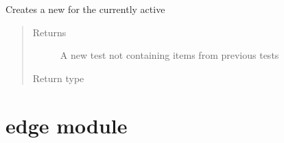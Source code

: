 \documentclass[letterpaper,10pt,english]{sphinxmanual}
\begin{document}
\begin{fulllineitems}
\begin{fulllineitems}
\end{fulllineitems}


\begin{fulllineitems}
\label{\detokenize{consumer:consumer.Consumer.create_test}}
Creates a new {\hyperref[\detokenize{test:test.Test}]{}} for the currently active {\hyperref[\detokenize{user:user.User}]{}}
\begin{quote}\begin{description}
\item[{Returns}] \leavevmode
A new test not containing items from previous tests

\item[{Return type}] \leavevmode
{\hyperref[\detokenize{test:test.Test}]{}}

\end{description}\end{quote}

\end{fulllineitems}


\end{fulllineitems}



\chapter{edge module}
\label{\detokenize{edge:edge-module}}\label{\detokenize{edge:module-edge}}\label{\detokenize{edge::doc}}
\end{document}
